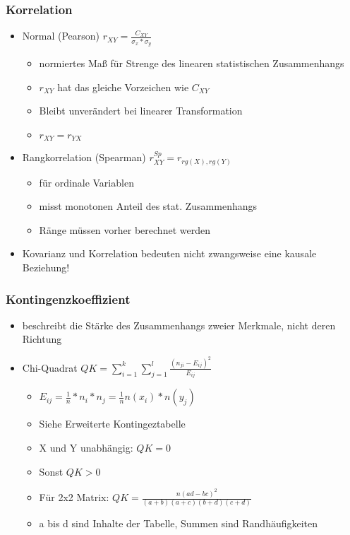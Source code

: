 \documentclass[a4paper]{article}
\begin{document}
\begin{landscape}
\begin{multicols}{4}
    \subsubsection*{Korrelation}
    \begin{itemize}[noitemsep,nolistsep,leftmargin=*]
        \item Normal (Pearson) $r_{XY} = \frac{C_{XY}}{\sigma_x * \sigma_y}$
        \begin{itemize}[noitemsep,nolistsep,leftmargin=*]
            \item normiertes Maß für Strenge des linearen statistischen Zusammenhangs
            \item $r_{XY}$ hat das gleiche Vorzeichen wie $C_{XY}$
            \item Bleibt unverändert bei linearer Transformation
            \item $r_{XY} = r_{YX}$
        \end{itemize}
        \item Rangkorrelation (Spearman) $r_{XY}^{Sp} = r_{rg(X), rg(Y)}$
        \begin{itemize}[noitemsep,nolistsep,leftmargin=*]
            \item für ordinale Variablen
            \item misst monotonen Anteil des stat. Zusammenhangs
            \item Ränge müssen vorher berechnet werden
        \end{itemize}
        \item Kovarianz und Korrelation bedeuten nicht zwangsweise eine kausale Beziehung!
    \end{itemize}

    \subsubsection*{Kontingenzkoeffizient}
    \begin{itemize}[noitemsep,nolistsep,leftmargin=*]
        \item beschreibt die Stärke des Zusammenhangs zweier Merkmale, nicht deren Richtung
        \item Chi-Quadrat $QK = \sum_{i=1}^{k}\sum_{j=1}^{l}\frac{(n_{ji}-E_{ij})^2}{E_{ij}}$
        \begin{itemize}[noitemsep,nolistsep,leftmargin=*]
            \item $E_{ij} = \frac{1}{n}*n_i*n_j = \frac{1}{n}n(x_i)*n(y_j)$
            \item Siehe Erweiterte Kontingeztabelle
            \item X und Y unabhängig: $QK = 0$
            \item Sonst $QK > 0$
            \item Für 2x2 Matrix: $QK = \frac{n(ad-bc)^2}{(a+b)(a+c)(b+d)(c+d)}$
            \item a bis d sind Inhalte der Tabelle, Summen sind Randhäufigkeiten
            

\end{itemize}
\end{itemize}
\end{multicols}
\end{landscape}
\end{document}
